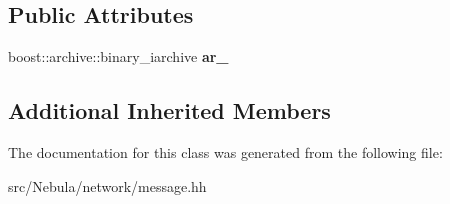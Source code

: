 \subsection*{Public Attributes}
\begin{DoxyCompactItemize}
\item 
\hypertarget{classgal_1_1network_1_1imessage_a024ced0e503c39e7ff210c6eff53c2fd}{boost\-::archive\-::binary\-\_\-iarchive {\bfseries ar\-\_\-}}\label{classgal_1_1network_1_1imessage_a024ced0e503c39e7ff210c6eff53c2fd}

\end{DoxyCompactItemize}
\subsection*{Additional Inherited Members}


The documentation for this class was generated from the following file\-:\begin{DoxyCompactItemize}
\item 
src/\-Nebula/network/message.\-hh\end{DoxyCompactItemize}
